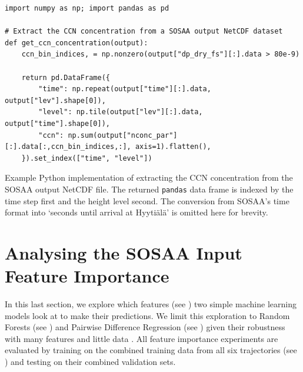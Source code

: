 \begin{listing}[H]
    \capstart %
    \begin{verbatim}
import numpy as np; import pandas as pd

# Extract the CCN concentration from a SOSAA output NetCDF dataset
def get_ccn_concentration(output):
    ccn_bin_indices, = np.nonzero(output["dp_dry_fs"][:].data > 80e-9)

    return pd.DataFrame({
        "time": np.repeat(output["time"][:].data, output["lev"].shape[0]),
        "level": np.tile(output["lev"][:].data, output["time"].shape[0]),
        "ccn": np.sum(output["nconc_par"][:].data[:,ccn_bin_indices,:], axis=1).flatten(),
    }).set_index(["time", "level"])
    \end{verbatim}
    \caption[CCN concentration calculation procedure]{Example Python implementation of extracting the CCN concentration from the SOSAA output NetCDF file. The returned \texttt{pandas} data frame is indexed by the time step first and the height level second. The conversion from SOSAA's time format into `seconds until arrival at Hyyti\"al\"a' is omitted here for brevity.}
    \label{exe:ccn-concentration}
\end{listing}

\section{Analysing the SOSAA Input Feature Importance} \label{txt:feature-importance}

In this last section, we explore which features (see ) two simple machine learning models look at to make their predictions. We limit this exploration to Random Forests (see ) and Pairwise Difference Regression (see ) given their robustness with many features and little data \citeauthor{padre-rf-2021}. All feature importance experiments are evaluated by training on the combined training data from all six trajectories (see ) and testing on their combined validation sets. 

